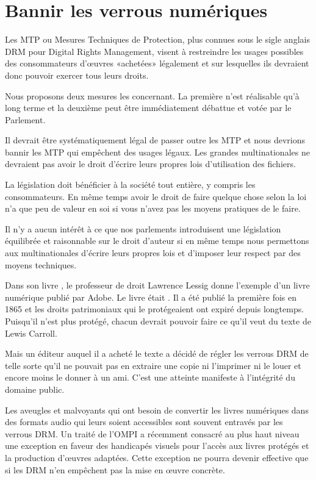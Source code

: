 \chapter{Bannir les verrous numériques}\label{verrous}

Les MTP ou Mesures Techniques de
Protection, plus
connues sous le sigle anglais DRM pour Digital
Rights Management, visent à restreindre les usages possibles des consommateurs d’œuvres «achetées»
légalement et sur lesquelles ils devraient donc pouvoir exercer tous leurs droits. 

Nous proposons deux mesures les concernant. La première n'est réalisable qu'à long terme et la deuxième peut être immédiatement débattue et votée par le Parlement.

\begin{mesure}
 Il devrait être systématiquement légal de passer outre les MTP et nous devrions bannir les MTP qui
empêchent des usages légaux. Les grandes multinationales ne devraient pas avoir le droit d’écrire
leurs propres lois d’utilisation des fichiers.
\end{mesure}

La législation doit bénéficier à la société tout entière, y compris les consommateurs. En même temps avoir le droit
de faire quelque chose selon la loi n’a que peu de valeur en soi si vous n’avez pas les moyens
pratiques de le faire.

Il n’y a aucun intérêt à ce que nos parlements introduisent une législation équilibrée et
raisonnable sur le droit d’auteur si en même temps nous permettons aux multinationales d’écrire
leurs propres lois et d’imposer leur respect par des moyens techniques.

Dans son livre , le professeur de droit Lawrence Lessig donne l’exemple d’un livre
numérique publié par Adobe. Le livre était . Il a été publié la première
fois en 1865 et les droits patrimoniaux qui le protégeaient ont expiré depuis longtemps. Puisqu’il n’est plus protégé,
chacun devrait pouvoir faire ce qu’il veut du texte de Lewis Carroll.

Mais un éditeur auquel il a acheté le texte a décidé de régler les verrous DRM de telle sorte qu'il ne pouvait pas en extraire une copie ni l’imprimer ni le louer et encore moins le donner à un ami. C'est une atteinte manifeste à l'intégrité du domaine public.  

Les aveugles et malvoyants qui ont besoin de convertir les livres numériques dans des formats audio
qui leurs soient accessibles sont souvent entravés par les verrous DRM. Un traité de l'OMPI a récemment consacré au plus haut niveau une exception en faveur des handicapés visuels pour l'accès aux livres protégés et la production d'œuvres adaptées. Cette exception ne pourra devenir effective que si les DRM n'en empêchent pas la mise en œuvre concrète.

